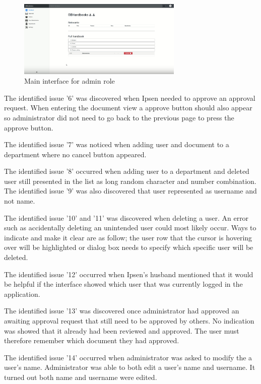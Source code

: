 \begin{figure}[H]
	\centering
		\includegraphics[width=0.7\textwidth]{billeder/MainInterfaceAdmin.png}
	\caption{Main interface for admin role}\label{fig:MainInterfaceAdmin}
\end{figure}

The identified issue '6' was discovered when Ipsen needed to approve an approval request.
When entering the document view a approve button should also appear so administrator did not need to go back to the previous page to press the approve button.

The identified issue '7' was noticed when adding user and document to a department where no cancel button appeared.

The identified issue '8' occurred when adding user to a department and deleted user still presented in the list as long random character and number combination. The identified issue '9' was also discovered that user represented as username and not name.

The identified issue '10'  and '11' was discovered when deleting a user.
An error such as accidentally deleting an unintended user could most likely occur.
Ways to indicate and make it clear are as follow; the user row that the cursor is hovering over will be highlighted or dialog box needs to specify which specific user will be deleted.

The identified issue '12' occurred when Ipsen's husband mentioned that it would be helpful if the interface showed which user that was currently logged in the application.

The identified issue '13' was discovered once administrator had approved an awaiting approval request that still need to be approved by others.
No indication was showed that it already had been reviewed and approved.
The user must therefore remember which document they had approved.

The identified issue '14' occurred when administrator was asked to modify the a user's name.
Administrator was able to both edit a user's name and username.
It turned out both name and username were edited.

